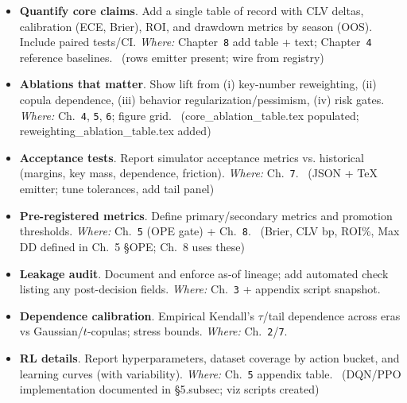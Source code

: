 \begin{itemize}
  \item {} \textbf{Quantify core claims}. Add a single table of record with CLV deltas, calibration (ECE, Brier), ROI, and drawdown metrics by season (OOS). Include paired tests/CI. \emph{Where:} Chapter~\texttt{8} add table + text; Chapter~\texttt{4} reference baselines. \done\ (rows emitter present; wire from registry)
  \item {} \textbf{Ablations that matter}. Show lift from (i) key-number reweighting, (ii) copula dependence, (iii) behavior regularization/pessimism, (iv) risk gates. \emph{Where:} Ch.~\texttt{4}, \texttt{5}, \texttt{6}; figure grid. \done\ (core\_ablation\_table.tex populated; reweighting\_ablation\_table.tex added)
  \item {} \textbf{Acceptance tests}. Report simulator acceptance metrics vs. historical (margins, key mass, dependence, friction). \emph{Where:} Ch.~\texttt{7}. \done\ (JSON + TeX emitter; tune tolerances, add tail panel)
\end{itemize}

\begin{itemize}
  \item {} \textbf{Pre-registered metrics}. Define primary/secondary metrics and promotion thresholds. \emph{Where:} Ch.~\texttt{5} (OPE gate) + Ch.~\texttt{8}. \done\ (Brier, CLV bp, ROI\%, Max DD defined in Ch.~5 \S OPE; Ch.~8 uses these)
  \item {} \textbf{Leakage audit}. Document and enforce as-of lineage; add automated check listing any post-decision fields. \emph{Where:} Ch.~\texttt{3} + appendix script snapshot. \wip
\end{itemize}

\begin{itemize}
  \item {} \textbf{Dependence calibration}. Empirical Kendall’s $\tau$/tail dependence across eras vs Gaussian/$t$-copulas; stress bounds. \emph{Where:} Ch.~\texttt{2}/\texttt{7}.
  \item {} \textbf{RL details}. Report hyperparameters, dataset coverage by action bucket, and learning curves (with variability). \emph{Where:} Ch.~\texttt{5} appendix table. \done\ (DQN/PPO implementation documented in \S5.subsec; viz scripts created)
\end{itemize}

